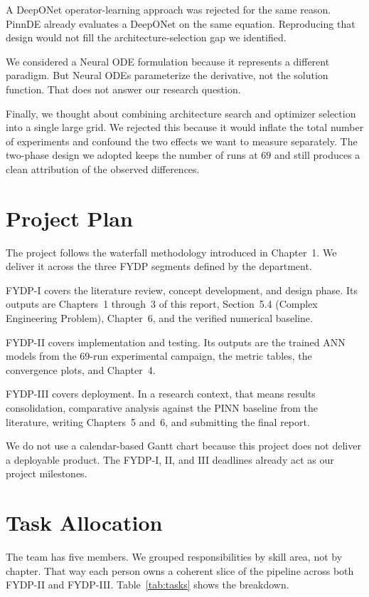 A DeepONet operator-learning approach was rejected for the same reason. PinnDE already evaluates a DeepONet on the same equation. Reproducing that design would not fill the architecture-selection gap we identified.

We considered a Neural ODE formulation because it represents a different paradigm. But Neural ODEs parameterize the derivative, not the solution function. That does not answer our research question.

Finally, we thought about combining architecture search and optimizer selection into a single large grid. We rejected this because it would inflate the total number of experiments and confound the two effects we want to measure separately. The two-phase design we adopted keeps the number of runs at $69$ and still produces a clean attribution of the observed differences.

\section{Project Plan}

The project follows the waterfall methodology introduced in Chapter~1. We deliver it across the three FYDP segments defined by the department.

FYDP-I covers the literature review, concept development, and design phase. Its outputs are Chapters~1 through~3 of this report, Section~5.4 (Complex Engineering Problem), Chapter~6, and the verified numerical baseline.

FYDP-II covers implementation and testing. Its outputs are the trained ANN models from the $69$-run experimental campaign, the metric tables, the convergence plots, and Chapter~4.

FYDP-III covers deployment. In a research context, that means results consolidation, comparative analysis against the PINN baseline from the literature, writing Chapters~5 and~6, and submitting the final report.

We do not use a calendar-based Gantt chart because this project does not deliver a deployable product. The FYDP-I, II, and III deadlines already act as our project milestones.

\section{Task Allocation}

The team has five members. We grouped responsibilities by skill area, not by chapter. That way each person owns a coherent slice of the pipeline across both FYDP-II and FYDP-III. Table~\ref{tab:tasks} shows the breakdown.


